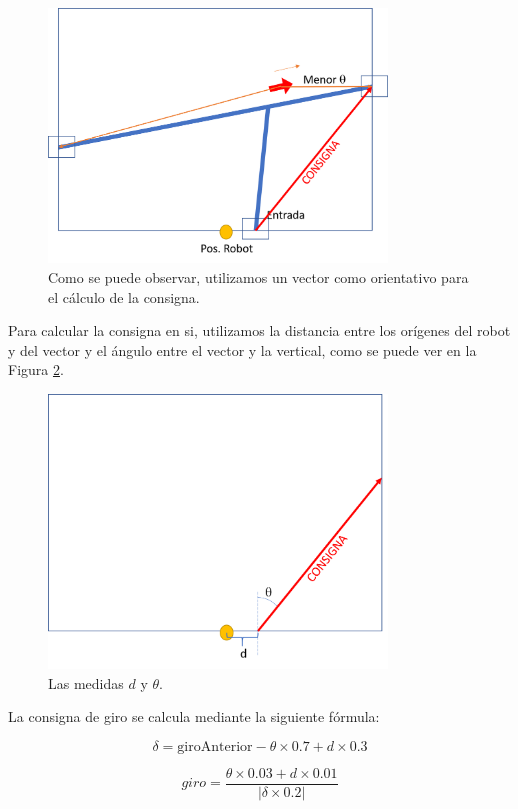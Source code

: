 \documentclass{article}
\begin{document}
        \begin{figure}[H]
            \centering
            \includegraphics[width=9cm]{figures/consigna6.png}
            \caption{Como se puede observar, utilizamos un vector como orientativo para el cálculo de la consigna.}
            \label{fig:consigna6}
        \end{figure}

        Para calcular la consigna en si, utilizamos la distancia entre los orígenes del robot y del vector y el ángulo entre el vector y la vertical, como se puede ver en la Figura \ref{fig:consigna7}.

        \begin{figure}[H]
            \centering
            \includegraphics[width=9cm]{figures/consigna7.png}
            \caption{Las medidas $d$ y $\theta$.}
            \label{fig:consigna7}
        \end{figure}
        
        La consigna de giro se calcula mediante la siguiente fórmula:

        $$\delta = \text{giroAnterior} - \theta \times 0.7 + d \times 0.3$$

        $$giro = \frac{\theta \times 0.03 + d \times 0.01}{|\delta \times 0.2|}$$
\end{document}
